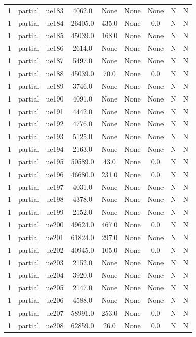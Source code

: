\begin{table}[ht]
\begin{tabular}{|c|c|c|c|c|c|c|c|c|}
1 & partial & ue183 & 4062.0 & None & None & None & N & N \\
1 & partial & ue184 & 26405.0 & 435.0 & None & 0.0 & N & N \\
1 & partial & ue185 & 45039.0 & 168.0 & None & None & N & N \\
1 & partial & ue186 & 2614.0 & None & None & None & N & N \\
1 & partial & ue187 & 5497.0 & None & None & None & N & N \\
1 & partial & ue188 & 45039.0 & 70.0 & None & 0.0 & N & N \\
1 & partial & ue189 & 3746.0 & None & None & None & N & N \\
1 & partial & ue190 & 4091.0 & None & None & None & N & N \\
1 & partial & ue191 & 4442.0 & None & None & None & N & N \\
1 & partial & ue192 & 4776.0 & None & None & None & N & N \\
1 & partial & ue193 & 5125.0 & None & None & None & N & N \\
1 & partial & ue194 & 2163.0 & None & None & None & N & N \\
1 & partial & ue195 & 50589.0 & 43.0 & None & 0.0 & N & N \\
1 & partial & ue196 & 46680.0 & 231.0 & None & 0.0 & N & N \\
1 & partial & ue197 & 4031.0 & None & None & None & N & N \\
1 & partial & ue198 & 4378.0 & None & None & None & N & N \\
1 & partial & ue199 & 2152.0 & None & None & None & N & N \\
1 & partial & ue200 & 49624.0 & 467.0 & None & 0.0 & N & N \\
1 & partial & ue201 & 61824.0 & 297.0 & None & None & N & N \\
1 & partial & ue202 & 40945.0 & 105.0 & None & 0.0 & N & N \\
1 & partial & ue203 & 2152.0 & None & None & None & N & N \\
1 & partial & ue204 & 3920.0 & None & None & None & N & N \\
1 & partial & ue205 & 2147.0 & None & None & None & N & N \\
1 & partial & ue206 & 4588.0 & None & None & None & N & N \\
1 & partial & ue207 & 58991.0 & 253.0 & None & 0.0 & N & N \\
1 & partial & ue208 & 62859.0 & 26.0 & None & 0.0 & N & N \\

\end{tabular}
\end{table}
